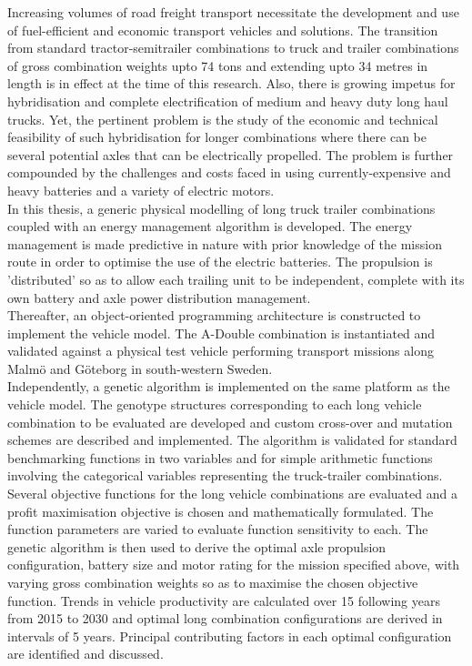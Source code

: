 Increasing volumes of road freight transport necessitate the development and use of fuel-efficient and economic transport vehicles and solutions. The transition from standard tractor-semitrailer combinations to truck and trailer combinations of gross combination weights upto 74 tons and extending upto 34 metres in length is in effect at the time of this research. Also, there is growing impetus for hybridisation and complete electrification of medium and heavy duty long haul trucks. Yet, the pertinent problem is the study of the economic and technical feasibility of such hybridisation for longer combinations where there can be several potential axles that can be electrically propelled. The problem is further compounded by the challenges and costs faced in using currently-expensive and heavy batteries and a variety of electric motors.\\

In this thesis, a generic physical modelling of long truck trailer combinations coupled with an energy management algorithm is developed. The energy management is made predictive in nature with prior knowledge of the mission route in order to optimise the use of the electric batteries. The propulsion is 'distributed' so as to allow each trailing unit to be independent, complete with its own battery and axle power distribution management.\\

Thereafter, an object-oriented programming architecture is constructed to implement the vehicle model. The A-Double combination is instantiated and validated against a physical test vehicle performing transport missions along Malm\"o and G\"oteborg in south-western Sweden.\\

Independently, a genetic algorithm is implemented on the same platform as the vehicle model. The genotype  structures corresponding to each long vehicle combination to be evaluated are developed and custom cross-over and mutation schemes are described and implemented. The algorithm is validated for standard benchmarking functions in two variables and for simple arithmetic functions involving the categorical variables representing the truck-trailer combinations.\\

Several objective functions for the long vehicle combinations are evaluated and a profit maximisation objective is chosen and mathematically formulated. The function parameters are varied to evaluate function sensitivity to each. The genetic algorithm is then used to derive the optimal axle propulsion configuration, battery size and motor rating for the mission specified above, with varying gross combination weights so as to maximise the chosen objective function. Trends in vehicle productivity are calculated over 15 following years from 2015 to 2030 and optimal long combination configurations are derived in intervals of 5 years. Principal contributing factors in each optimal configuration are identified and discussed.\\